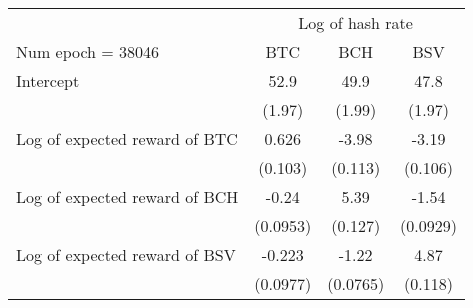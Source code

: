 
\begin{tabular}[t]{lccc}
\toprule
\multicolumn{1}{c}{ } & \multicolumn{3}{c}{Log of hash rate} \\
\cmidrule(l{3pt}r{3pt}){2-4}
Num epoch = 38046 & BTC & BCH & BSV\\
\midrule
Intercept & 52.9 & 49.9 & 47.8\\
 & (1.97) & (1.99) & (1.97)\\
Log of expected reward of BTC & 0.626 & -3.98 & -3.19\\
 & (0.103) & (0.113) & (0.106)\\
Log of expected reward of BCH & -0.24 & 5.39 & -1.54\\
 & (0.0953) & (0.127) & (0.0929)\\
Log of expected reward of BSV & -0.223 & -1.22 & 4.87\\
 & (0.0977) & (0.0765) & (0.118)\\
\bottomrule
\end{tabular}
